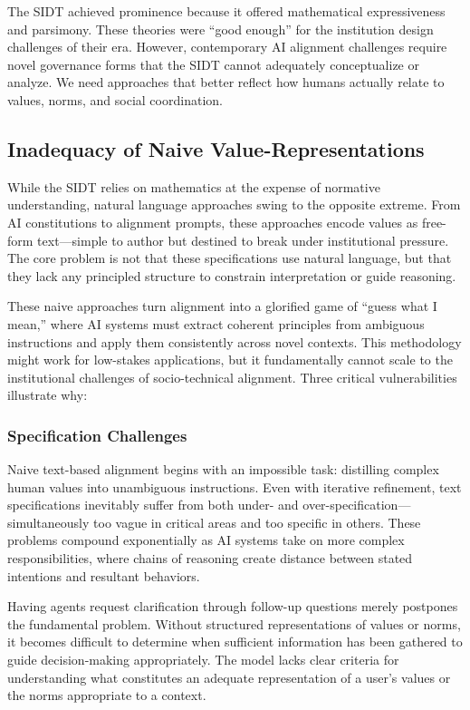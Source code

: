 The SIDT achieved prominence because it offered mathematical expressiveness and parsimony. These theories were ``good enough'' for the institution design challenges of their era. However, contemporary AI alignment challenges require novel governance forms that the SIDT cannot adequately conceptualize or analyze. We need approaches that better reflect how humans actually relate to values, norms, and social coordination.

\subsection{Inadequacy of Naive Value-Representations}

While the SIDT relies on mathematics at the expense of normative understanding, natural language approaches swing to the opposite extreme. From AI constitutions to alignment prompts, these approaches encode values as free-form text—simple to author but destined to break under institutional pressure. The core problem is not that these specifications use natural language, but that they lack any principled structure to constrain interpretation or guide reasoning.

These naive approaches turn alignment into a glorified game of ``guess what I mean,'' where AI systems must extract coherent principles from ambiguous instructions and apply them consistently across novel contexts. This methodology might work for low-stakes applications, but it fundamentally cannot scale to the institutional challenges of socio-technical alignment. Three critical vulnerabilities illustrate why:

\subsubsection{Specification Challenges}

Naive text-based alignment begins with an impossible task: distilling complex human values into unambiguous instructions. Even with iterative refinement, text specifications inevitably suffer from both under- and over-specification—simultaneously too vague in critical areas and too specific in others. These problems compound exponentially as AI systems take on more complex responsibilities, where chains of reasoning create distance between stated intentions and resultant behaviors.

Having agents request clarification through follow-up questions merely postpones the fundamental problem. Without structured representations of values or norms, it becomes difficult to determine when sufficient information has been gathered to guide decision-making appropriately. The model lacks clear criteria for understanding what constitutes an adequate representation of a user's values or the norms appropriate to a context.

